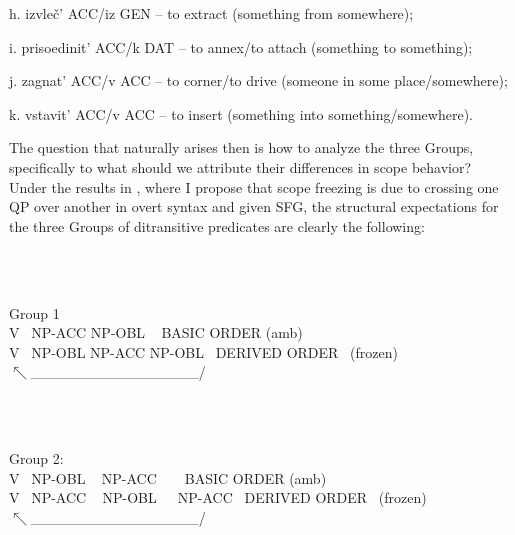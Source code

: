 \documentclass[output=paper,modfonts, nonflat]{langsci/langscibook}
\begin{document}
\begin{styleinnerExample}
  h.   izvleč’ ACC/iz GEN – to extract (something from somewhere);
\end{styleinnerExample}

\begin{styleinnerExample}
  i.   prisoedinit’ ACC/k DAT – to annex/to attach (something to something);
\end{styleinnerExample}

\begin{styleinnerExample}
  j. zagnat’ ACC/v ACC – to corner/to drive (someone in some place/somewhere);
\end{styleinnerExample}

\begin{styleinnerExample}
  k. vstavit’ ACC/v ACC – to insert (something into something/somewhere).
\end{styleinnerExample}

The question that naturally arises then is how to analyze the three Groups, specifically to what should we attribute their differences in scope behavior? Under the results in \citet{Antonyuk2015}, where I propose that scope freezing is due to crossing one QP over another in overt syntax and given SFG, the structural expectations for the three Groups of ditransitive predicates are clearly the following:

\ea%
    \label{ex:key:19}
    \gll\\
        \\
    \glt
    \z

          Group 1\\
V ~NP-ACC NP-OBL ~     BASIC ORDER (amb)\\
V ~NP-OBL NP-ACC NP-OBL~   DERIVED ORDER ~(frozen)\\
    $\nwarrow $\_\_\_\_\_\_\_\_\_\_\_\_\_\_\_\_/

\ea%
    \label{ex:key:20}
    \gll\\
        \\
    \glt
    \z

          Group 2:\\
V ~NP-OBL ~ NP-ACC ~ ~     BASIC ORDER (amb)\\
V ~NP-ACC ~ NP-OBL~~~NP-ACC~   DERIVED ORDER ~(frozen)\\
           $\nwarrow $\_\_\_\_\_\_\_\_\_\_\_\_\_\_\_\_/

\ea%
    \label{ex:key:21}
    \gll\\
        \\
    \glt
    \z
\end{document}
